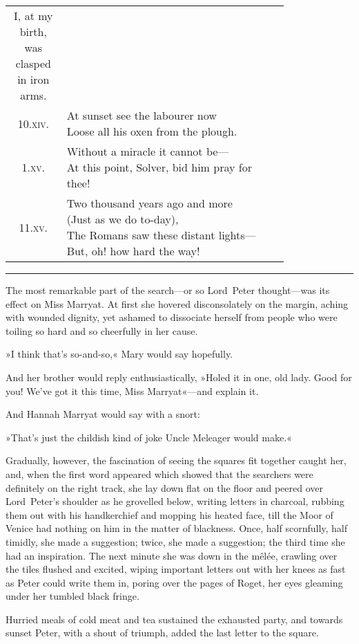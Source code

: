 \begin{longtable} {c p{0.8\linewidth}}
{I, at my birth, was clasped in iron arms.}\\
10.\textsc{xiv.} &  \makecell[l]{At sunset see the labourer now\\
Loose all his oxen from the plough.}\\
1.\textsc{xv.} &  \makecell[l]{Without a miracle it cannot be—\\
At this point, Solver, bid him pray for thee!}\\[.3cm] 
11.\textsc{xv.} &  \makecell[l]{Two thousand years ago and more\\
(Just as we do to-day),\\
The Romans saw these distant lights—\\
But, oh! how hard the way!}
\end{longtable}

\noindent\hfil\rule{0.5\textwidth}{.4pt}\hfil 

The most remarkable part of the search—or so Lord~Peter thought—was its effect on Miss Marryat. At first she hovered disconsolately on the margin, aching with wounded dignity, yet ashamed to dissociate herself from people who were toiling so hard and so cheerfully in her cause.

»I think that's so-and-so,« Mary would say hopefully.

And her brother would reply enthusiastically, »Holed it in one, old lady. Good for you! We've got it this time, Miss Marryat«—and explain it.

And Hannah Marryat would say with a snort:

»That's just the childish kind of joke Uncle Meleager would make.«

Gradually, however, the fascination of seeing the squares fit together caught her, and, when the first word appeared which showed that the searchers were definitely on the right track, she lay down flat on the floor and peered over Lord~Peter's shoulder as he grovelled below, writing letters in charcoal, rubbing them out with his handkerchief and mopping his heated face, till the Moor of Venice had nothing on him in the matter of blackness. Once, half scornfully, half timidly, she made a suggestion; twice, she made a suggestion; the third time she had an inspiration. The next minute she was down in the mêlée, crawling over the tiles flushed and excited, wiping important letters out with her knees as fast as Peter could write them in, poring over the pages of Roget, her eyes gleaming under her tumbled black fringe.

Hurried meals of cold meat and tea sustained the exhausted party, and towards sunset Peter, with a shout of triumph, added the last letter to the square.

